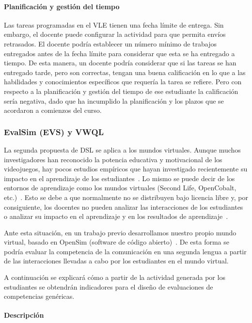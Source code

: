 				\paragraph*{Planificación y gestión del tiempo}
				Las tareas programadas en el VLE tienen una fecha límite de entrega. Sin embargo, el docente puede configurar la actividad para que permita envíos retrasados. El docente podría establecer un número mínimo de trabajos entregados antes de la fecha límite para considerar que esta se ha entregado a tiempo. De esta manera, un docente podría considerar que si las tareas se han entregado tarde, pero son correctas, tengan una buena calificación en lo que a las habilidades y conocimientos específicos que requería la tarea se refiere. Pero con respecto a la planificación y gestión del tiempo de ese estudiante la calificación sería negativa, dado que ha incumplido la planificación y los plazos que se acordaron a comienzos del curso.

		\subsubsection{EvalSim (EVS) y VWQL} \label{subcha:evs}

		La segunda propuesta de DSL se aplica a los mundos virtuales. Aunque muchos investigadores han reconocido la potencia educativa y motivacional de los videojuegos, hay pocos estudios empíricos que hayan investigado recientemente su impacto en el aprendizaje de los estudiantes~\cite{berns2013game}. Lo mismo se puede decir de los entornos de aprendizaje como los mundos virtuales (Second Life, OpenCobalt, etc.)~\cite{hew2010use}. Esto se debe a que normalmente no se distribuyen bajo licencia libre y, por consiguiente, los docentes no pueden analizar las interacciones de los estudiantes o analizar su impacto en el aprendizaje y en los resultados de aprendizaje~\cite{cruz2015discovering,moreno2014serious}. 

		Ante esta situación, en un trabajo previo desarrollamos nuestro propio mundo virtual, basado en OpenSim (software de código abierto)~\cite{berns2013using}. De esta forma se podría evaluar la competencia de la comunicación en una segunda lengua a partir de las interacciones llevadas a cabo por los estudiantes en el mundo virtual.

		A continuación se explicará cómo a partir de la actividad generada por los estudiantes se obtendrán indicadores para el diseño de evaluaciones de competencias genéricas.

			\paragraph{Descripción}

